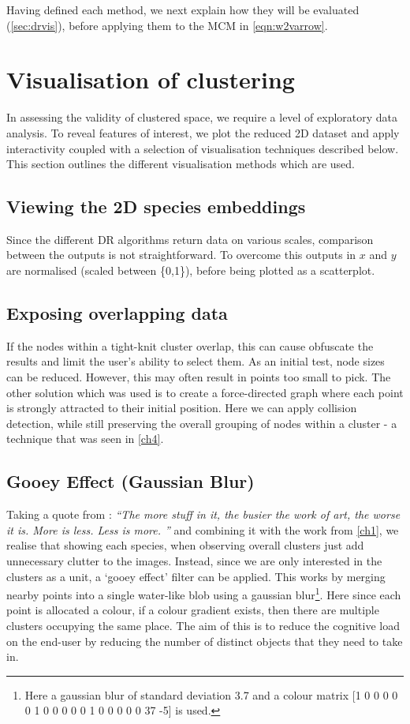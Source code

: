 Having defined each method, we next explain how they will be evaluated (\autoref{sec:drvis}), before applying them to the MCM in \autoref{eqn:w2varrow}.




\section{Visualisation of clustering}\label{sec:drvis}

In assessing the validity of clustered space, we require a level of exploratory data analysis. To reveal features of interest, we plot the reduced 2D dataset and apply interactivity coupled with a selection of visualisation techniques described below. This section outlines the different visualisation methods which are used.

\subsection{Viewing the 2D species embeddings}
Since the different DR algorithms return data on various scales, comparison between the outputs is not straightforward. To overcome this outputs in $x$ and $y$ are normalised (scaled between \{0,1\}), before being plotted as a scatterplot. 


\subsection{Exposing overlapping data}
If the nodes within a tight-knit cluster overlap, this can cause obfuscate the results and limit the user's ability to select them. As an initial test, node sizes can be reduced. However, this may often result in points too small to pick. The other solution which was used is to create a force-directed graph where each point is strongly attracted to their initial position. Here we can apply collision detection, while still preserving the overall grouping of nodes within a cluster - a technique that was seen in \autoref{ch4}.


\subsection{Gooey Effect (Gaussian Blur)}
Taking a quote from \cite{lessmore}:
\emph{``The more stuff in it, the busier the work of art, the worse it is. More is less. Less is more. %
''} and combining it with the work from \autoref{ch1}, we realise that showing each species, when observing overall clusters just add unnecessary clutter to the images. Instead, since we are only interested in the clusters as a unit, a `gooey effect' filter can be applied. This works by merging nearby points into a single water-like blob using a gaussian blur\footnote{Here a gaussian blur of standard deviation 3.7 and a colour matrix [1 0 0 0 0  0 1 0 0 0  0 0 1 0 0  0 0 0 37 -5] is used.}. Here since each point is allocated a colour, if a colour gradient exists, then there are multiple clusters occupying the same place. The aim of this is to reduce the cognitive load on the end-user by reducing the number of distinct objects that they need to take in.




